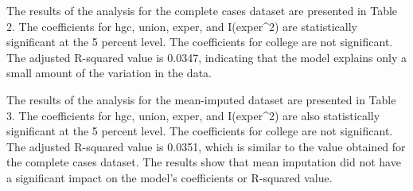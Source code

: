 \documentclass{article}
\begin{document}
\begin{table}
The results of the analysis for the complete cases dataset are presented in Table 2. The coefficients for hgc, union, exper, and I(exper^2) are statistically significant at the 5 percent  level. The coefficients for college are not significant. The adjusted R-squared value is 0.0347, indicating that the model explains only a small amount of the variation in the data.

The results of the analysis for the mean-imputed dataset are presented in Table 3. The coefficients for hgc, union, exper, and I(exper^2) are also statistically significant at the 5 percent  level. The coefficients for college are not significant. The adjusted R-squared value is 0.0351, which is similar to the value obtained for the complete cases dataset. The results show that mean imputation did not have a significant impact on the model's coefficients or R-squared value.
\end{table}
\end{document}
